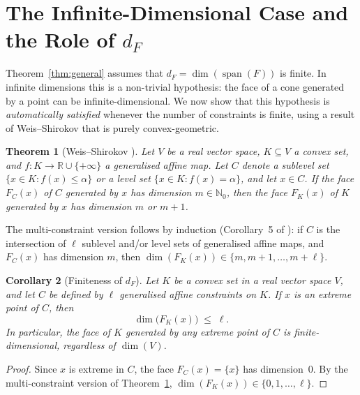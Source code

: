 \documentclass[11pt,a4paper]{article}
\newtheorem{theorem}{Theorem}
\newtheorem{corollary}[theorem]{Corollary}
\theoremstyle{definition}
\newcommand{\R}{\mathbb{R}}
\newcommand{\spn}{\operatorname{span}}
\begin{document}
\section{The Infinite-Dimensional Case and the Role of $d_F$}
\label{sec:infinite-dim}

Theorem~\ref{thm:general} assumes that $d_F = \dim(\spn(F))$ is
finite.  In infinite dimensions this is a non-trivial hypothesis:
the face of a cone generated by a point can be
infinite-dimensional.  We now show that this hypothesis is
\emph{automatically satisfied} whenever the number of constraints
is finite, using a result of Weis--Shirokov that is purely
convex-geometric.

\begin{theorem}[Weis--Shirokov {\cite[Theorem~3.3]{weis_shirokov21}}]
\label{thm:ws}
Let $V$ be a real vector space, $K \subseteq V$ a convex set, and
$f \colon K \to \R \cup \{+\infty\}$ a generalised affine map.
Let $C$ denote a sublevel set $\{x \in K : f(x) \leq \alpha\}$
or a level set $\{x \in K : f(x) = \alpha\}$, and let $x \in C$.
If the face $F_C(x)$ of $C$ generated by $x$ has dimension
$m \in \mathbb{N}_0$, then the face $F_K(x)$ of $K$ generated by
$x$ has dimension $m$ or $m + 1$.
\end{theorem}

The multi-constraint version follows by induction (Corollary~5 of
\cite{weis_shirokov21}): if $C$ is the intersection of $\ell$
sublevel and/or level sets of generalised affine maps, and
$F_C(x)$ has dimension $m$, then
$\dim(F_K(x)) \in \{m, m+1, \ldots, m + \ell\}$.

\begin{corollary}[Finiteness of $d_F$]\label{cor:dF-finite}
Let $K$ be a convex set in a real vector space $V$, and let $C$ be
defined by $\ell$ generalised affine constraints on $K$.  If $x$
is an extreme point of $C$, then
\[
  \dim\bigl(F_K(x)\bigr) \;\leq\; \ell.
\]
In particular, the face of $K$ generated by any extreme point of
$C$ is finite-dimensional, regardless of $\dim(V)$.
\end{corollary}

\begin{proof}
Since $x$ is extreme in $C$, the face $F_C(x) = \{x\}$ has
dimension~$0$.  By the multi-constraint version of
Theorem~\ref{thm:ws}, $\dim(F_K(x)) \in \{0, 1, \ldots, \ell\}$.
\end{proof}
\end{document}
